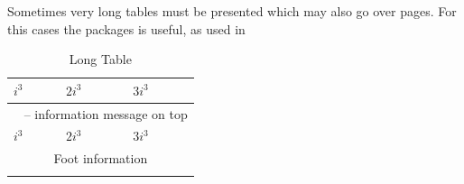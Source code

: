 Sometimes very long tables must be presented which may also go over pages. For this cases the packages  is useful, as used in 

\begin{center}
\begin{longtable}{l|l|l}


 \hline \hline
 $i^3$ & $2i^3$ & $3i^3$ \bigstrut \\ \hline
 \endfirsthead
 
 \multicolumn{3}{c}{\tablename\ \thetable{} -- information message on top} \\
 \hline
 $i^3$ & $2i^3$ & $3i^3$ \bigstrut \\ \hline 
 \endhead
 
 \hline
 \multicolumn{3}{c}{Foot information} \\ \hline
 \endfoot
 
 \hline \hline
 \caption{Long Table}
 \label{lt}
 \endlastfoot
 

\end{longtable}
\end{center}
